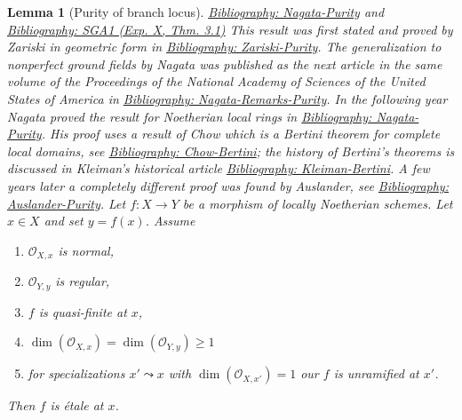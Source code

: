 \documentclass{amsart}
\newenvironment{reference}{\comment}{\endcomment}
\newenvironment{history}{\comment}{\endcomment}
\theoremstyle{plain}
\newtheorem{lemma}[subsection]{Lemma}
\theoremstyle{definition}
\theoremstyle{remark}
\numberwithin{equation}{subsection}
\begin{document}
\begin{lemma}[Purity of branch locus]
\label{lemma-purity}
\begin{reference}
\href{https://stacks.math.columbia.edu/bibliography}{Bibliography: Nagata-Purity} and \href{https://stacks.math.columbia.edu/bibliography}{Bibliography: SGA1 (Exp. X, Thm. 3.1)}
\end{reference}
\begin{history}
This result was first stated and proved by Zariski in
geometric form in \href{https://stacks.math.columbia.edu/bibliography}{Bibliography: Zariski-Purity}.
The generalization to nonperfect ground fields by Nagata
was published as the next article in the same volume of the
Proceedings of the National Academy of Sciences of the United States of America
in \href{https://stacks.math.columbia.edu/bibliography}{Bibliography: Nagata-Remarks-Purity}. In the following year Nagata
proved the result for Noetherian local rings in \href{https://stacks.math.columbia.edu/bibliography}{Bibliography: Nagata-Purity}.
His proof uses a result of Chow which is a Bertini theorem for
complete local domains, see \href{https://stacks.math.columbia.edu/bibliography}{Bibliography: Chow-Bertini};
the history of Bertini's theorems is discussed in
Kleiman's historical article \href{https://stacks.math.columbia.edu/bibliography}{Bibliography: Kleiman-Bertini}.
A few years later a completely different proof was found by
Auslander, see \href{https://stacks.math.columbia.edu/bibliography}{Bibliography: Auslander-Purity}.
\end{history}
Let $f : X \to Y$ be a morphism of locally Noetherian schemes.
Let $x \in X$ and set $y = f(x)$. Assume
\begin{enumerate}
\item $\mathcal{O}_{X, x}$ is normal,
\item $\mathcal{O}_{Y, y}$ is regular,
\item $f$ is quasi-finite at $x$,
\item $\dim(\mathcal{O}_{X, x}) = \dim(\mathcal{O}_{Y, y}) \geq 1$
\item for specializations $x' \leadsto x$ with
$\dim(\mathcal{O}_{X, x'}) = 1$ our $f$ is unramified at $x'$.
\end{enumerate}
Then $f$ is \'etale at $x$.
\end{lemma}
\end{document}
